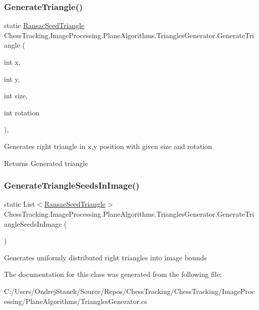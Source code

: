 \subsubsection{\texorpdfstring{GenerateTriangle()}{GenerateTriangle()}}
{\footnotesize\ttfamily static \mbox{\hyperlink{class_chess_tracking_1_1_image_processing_1_1_plane_algorithms_1_1_ransac_seed_triangle}{Ransac\+Seed\+Triangle}} Chess\+Tracking.\+Image\+Processing.\+Plane\+Algorithms.\+Triangles\+Generator.\+Generate\+Triangle (\begin{DoxyParamCaption}\item[{int}]{x,  }\item[{int}]{y,  }\item[{int}]{size,  }\item[{int}]{rotation }\end{DoxyParamCaption})\hspace{0.3cm}{\ttfamily [static]}, {\ttfamily [private]}}



Generates right triangle in x,y position with given size and rotation 

\begin{DoxyReturn}{Returns}
Generated triangle
\end{DoxyReturn}
\mbox{\label{class_chess_tracking_1_1_image_processing_1_1_plane_algorithms_1_1_triangles_generator_ad775d166a286ff617c5ab4e3ce96e688}} 
\subsubsection{\texorpdfstring{GenerateTriangleSeedsInImage()}{GenerateTriangleSeedsInImage()}}
{\footnotesize\ttfamily static List$<$\mbox{\hyperlink{class_chess_tracking_1_1_image_processing_1_1_plane_algorithms_1_1_ransac_seed_triangle}{Ransac\+Seed\+Triangle}}$>$ Chess\+Tracking.\+Image\+Processing.\+Plane\+Algorithms.\+Triangles\+Generator.\+Generate\+Triangle\+Seeds\+In\+Image (\begin{DoxyParamCaption}{ }\end{DoxyParamCaption})\hspace{0.3cm}{\ttfamily [static]}}



Generates uniformly distributed right triangles into image bounds 



The documentation for this class was generated from the following file\+:\begin{DoxyCompactItemize}
\item 
C\+:/\+Users/\+Ondrej\+Stanek/\+Source/\+Repos/\+Chess\+Tracking/\+Chess\+Tracking/\+Image\+Processing/\+Plane\+Algorithms/Triangles\+Generator.\+cs\end{DoxyCompactItemize}
